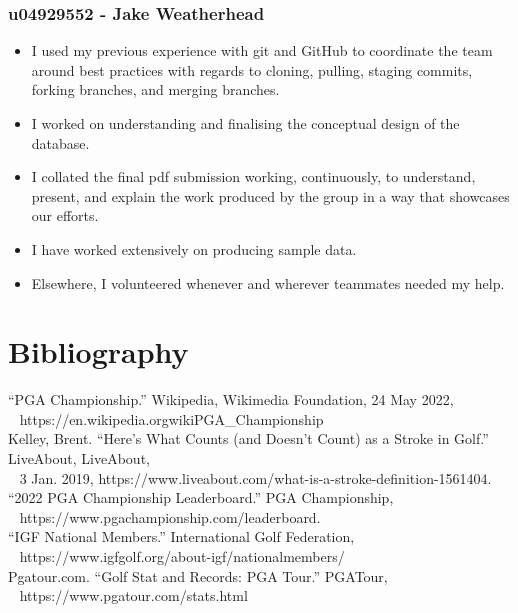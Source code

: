\documentclass[titlepage]{article}
\begin{document}
\subsubsection*{u04929552 - Jake Weatherhead}
\vspace{1em}
\begin{itemize}
  \item I used my previous experience with git and GitHub to coordinate the team around best practices with regards to cloning, 
        pulling, staging commits, forking branches, and merging branches.
  \item I worked on understanding and finalising the conceptual design of the database.
  \item I collated the final pdf submission working, continuously, to understand, present, and explain the work produced
        by the group in a way that showcases our efforts.
  \item I have worked extensively on producing sample data.
  \item Elsewhere, I volunteered whenever and wherever teammates needed my help.
\end{itemize}

\newpage
\section{Bibliography}
\vspace{2em}
“PGA Championship.” Wikipedia, Wikimedia Foundation, 24 May 2022, \\
\-\ \hspace{15pt} https://en.wikipedia.org\/wiki\/PGA\_Championship \\

\noindent
Kelley, Brent. “Here's What Counts (and Doesn't Count) as a Stroke in Golf.” LiveAbout, LiveAbout, \\
\-\ \hspace{15pt} 3 Jan. 2019, https://www.liveabout.com/what-is-a-stroke-definition-1561404. \\

\noindent
“2022 PGA Championship Leaderboard.” PGA Championship, \\
\-\ \hspace{15pt} https://www.pgachampionship.com/leaderboard. \\

\noindent
“IGF National Members.” International Golf Federation, \\ 
\-\ \hspace{15pt} https://www.igfgolf.org/about-igf/nationalmembers/ \\ 

\noindent
Pgatour.com. “Golf Stat and Records: PGA Tour.” PGATour, \\
\-\ \hspace{15pt} https://www.pgatour.com/stats.html \\
\end{document}
